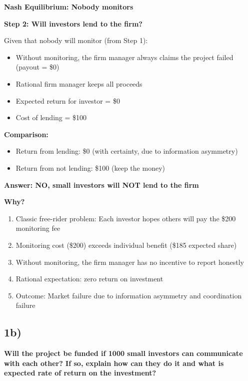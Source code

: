 \documentclass[a4paper]{article}
\begin{document}
\textbf{Nash Equilibrium: Nobody monitors}

\textbf{Step 2: Will investors lend to the firm?}

Given that nobody will monitor (from Step 1):

\begin{itemize}
\item
  Without monitoring, the firm manager always claims the project failed
  (payout = \$0)
\item
  Rational firm manager keeps all proceeds
\item
  Expected return for investor = \$0
\item
  Cost of lending = \$100
\end{itemize}

\textbf{Comparison:}

\begin{itemize}
\item
  Return from lending: \$0 (with certainty, due to information
  asymmetry)
\item
  Return from not lending: \$100 (keep the money)
\end{itemize}

\textbf{Answer: NO, small investors will NOT lend to the firm}

\textbf{Why?}

\begin{enumerate}
\def\labelenumi{\arabic{enumi}.}
\item
  Classic free-rider problem: Each investor hopes others will pay the
  \$200 monitoring fee
\item
  Monitoring cost (\$200) exceeds individual benefit (\$185 expected
  share)
\item
  Without monitoring, the firm manager has no incentive to report
  honestly
\item
  Rational expectation: zero return on investment
\item
  Outcome: Market failure due to information asymmetry and coordination
  failure
\end{enumerate}

\hypertarget{b}{%
\subsection{1b)}\label{b}}

\textbf{Will the project be funded if 1000 small investors can
communicate with each other? If so, explain how can they do it and what
is expected rate of return on the investment?}
\end{document}
